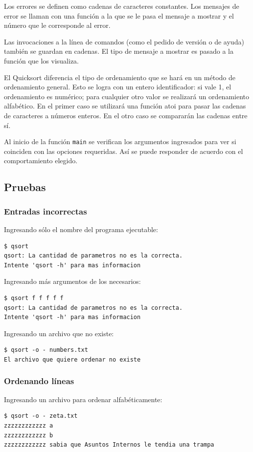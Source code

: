 \documentclass[a4paper, 12pt]{article}
\begin{document}
		Los errores se definen como cadenas de caracteres constantes. Los mensajes de error se llaman con una función a la que se le pasa el mensaje a mostrar y el número que le corresponde al error.
		
		Las invocaciones a la línea de comandos (como el pedido de versión o de ayuda) también se guardan en cadenas. El tipo de mensaje a mostrar es pasado a la función que los visualiza.
		
		El Quicksort diferencia el tipo de ordenamiento que se hará en un método de ordenamiento general. Esto se logra con un entero identificador: si vale 1, el ordenamiento es numérico; para cualquier otro valor se realizará un ordenamiento alfabético. En el primer caso se utilizará una función atoi para pasar las cadenas de caracteres a números enteros. En el otro caso se compararán las cadenas entre sí.
		
		Al inicio de la función \texttt{main} se verifican los argumentos ingresados para ver si coinciden con las opciones requeridas.	Así se puede responder de acuerdo con el comportamiento elegido. 
		
	\subsection{Pruebas}
	
	\subsubsection{Entradas incorrectas}
	Ingresando sólo el nombre del programa ejecutable:
	\begin{verbatim}
$ qsort
qsort: La cantidad de parametros no es la correcta.
Intente 'qsort -h' para mas informacion
	\end{verbatim}
	
	Ingresando más argumentos de los necesarios:
	\begin{verbatim}
$ qsort f f f f f
qsort: La cantidad de parametros no es la correcta.
Intente 'qsort -h' para mas informacion
	\end{verbatim}
	
	Ingresando un archivo que no existe:
	\begin{verbatim}
$ qsort -o - numbers.txt
El archivo que quiere ordenar no existe
	\end{verbatim}
	
	\subsubsection{Ordenando líneas}
	Ingresando un archivo para ordenar alfabéticamente:
	\begin{verbatim}
$ qsort -o - zeta.txt
zzzzzzzzzzzz a
zzzzzzzzzzzz b
zzzzzzzzzzzz sabia que Asuntos Internos le tendia una trampa
	\end{verbatim}
	
\end{document}
